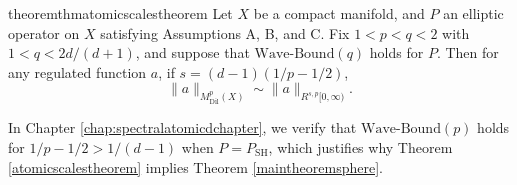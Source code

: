 \vspace{0.5em}

\noindent {}

\vspace{0.4em}

\begin{restatable}{theorem}{thmatomicscalestheorem} \label{atomicscalestheorem}
  Let $X$ be a compact manifold, and $P$ an elliptic operator on $X$ satisfying Assumptions A, B, and C. Fix $1 < p < q < 2$ with $1 < q < 2d/(d+1)$, and suppose that $\text{Wave-Bound}(q)$ holds for $P$. Then for any regulated function $a$, if $s = (d-1)(1/p - 1/2)$,
  \[ \| a \|_{M^p_{\text{Dil}}(X)} \sim \| a \|_{R^{s,p}[0,\infty)}. \]
\end{restatable}

In Chapter \ref{chap:spectralatomicdchapter}, we verify that $\text{Wave-Bound}(p)$ holds for $1/p - 1/2 > 1/(d-1)$ when $P = P_{\text{SH}}$, which justifies why Theorem \ref{atomicscalestheorem} implies Theorem \ref{maintheoremsphere}.%




